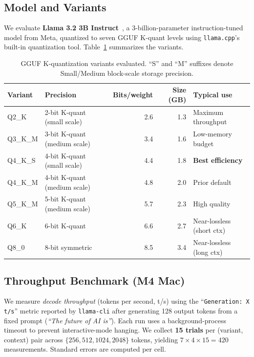 \documentclass{article}
\begin{document}
\subsection{Model and Variants}

We evaluate \textbf{Llama 3.2 3B Instruct}~\cite{llama3}, a 3-billion-parameter instruction-tuned model from Meta, quantized to seven GGUF K-quant levels using \texttt{llama.cpp}'s built-in quantization tool. Table~\ref{tab:variants} summarizes the variants.

\begin{table}[h]
\centering
\caption{GGUF K-quantization variants evaluated. ``S'' and ``M'' suffixes denote Small/Medium block-scale storage precision.}
\label{tab:variants}
\small
\begin{tabular}{llrrl}
\toprule
\textbf{Variant} & \textbf{Precision} & \textbf{Bits/weight} & \textbf{Size (GB)} & \textbf{Typical use} \\
\midrule
Q2\_K   & 2-bit K-quant (small scale)  & 2.6 & 1.3 & Maximum throughput \\
Q3\_K\_M & 3-bit K-quant (medium scale) & 3.4 & 1.6 & Low-memory budget  \\
Q4\_K\_S & 4-bit K-quant (small scale)  & 4.4 & 1.8 & \textbf{Best efficiency} \\
Q4\_K\_M & 4-bit K-quant (medium scale) & 4.8 & 2.0 & Prior default      \\
Q5\_K\_M & 5-bit K-quant (medium scale) & 5.7 & 2.3 & High quality       \\
Q6\_K   & 6-bit K-quant               & 6.6 & 2.7 & Near-lossless (short ctx) \\
Q8\_0   & 8-bit symmetric             & 8.5 & 3.4 & Near-lossless (long ctx)  \\
\bottomrule
\end{tabular}
\end{table}

\subsection{Throughput Benchmark (M4 Mac)}

We measure \emph{decode throughput} (tokens per second, t/s) using the ``\texttt{Generation: X t/s}'' metric reported by \texttt{llama-cli} after generating 128 output tokens from a fixed prompt (\textit{``The future of AI is''}). Each run uses a background-process timeout to prevent interactive-mode hanging. We collect \textbf{15 trials} per (variant, context) pair across $\{256, 512, 1024, 2048\}$ tokens, yielding $7 \times 4 \times 15 = 420$ measurements. Standard errors are computed per cell.
\end{document}
